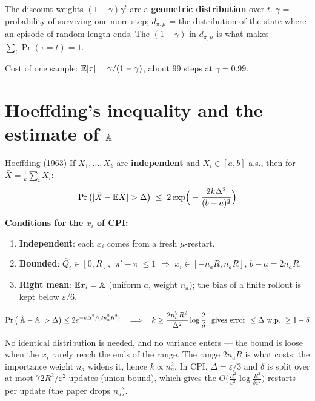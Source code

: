 \begin{keybox}
The discount weights $(1-\gamma)\gamma^t$ are a \textbf{geometric distribution} over $t$. $\gamma$ = probability of surviving one more step; $d_{\pi,\mu}$ = the distribution of the state where an episode of random length ends. The $(1-\gamma)$ in $d_{\pi,\mu}$ is what makes $\sum_t\Pr(\tau=t)=1$.
\end{keybox}
{\small Cost of one sample: $\mathbb{E}[\tau]=\gamma/(1-\gamma)$, about 99 steps at $\gamma=0.99$.}

\section{Hoeffding's inequality and the estimate of $\mathbb{A}$}
\label{app:hoeffding}

\begin{thmbox}{Hoeffding (1963)}
If $X_1,\dots,X_k$ are \textbf{independent} and $X_i\in[a,b]$ a.s., then for $\bar X=\frac1k\sum_iX_i$:
\begin{gather*}
  \Pr\big(|\bar X-\E\bar X|>\Delta\big) \;\le\; 2\exp\!\Big(-\frac{2k\Delta^2}{(b-a)^2}\Big)
\end{gather*}
\end{thmbox}

\textbf{Conditions for the $x_i$ of CPI:}
\begin{enumerate}
  \item \textbf{Independent}: each $x_i$ comes from a fresh $\mu$-restart.
  \item \textbf{Bounded}: $\hat Q_i\in[0,R]$, $|\pi'-\pi|\le1$ $\Rightarrow$ $x_i\in[-n_aR,n_aR]$, $b-a=2n_aR$.
  \item \textbf{Right mean}: $\mathbb{E} x_i=\mathbb{A}$ (uniform $a$, weight $n_a$); the bias of a finite rollout is kept below $\varepsilon/6$.
\end{enumerate}

\begin{eqbox}
\begin{gather*}
  \Pr\big(|\hat\PA-\PA|>\Delta\big) \le 2e^{-k\Delta^2/(2n_a^2R^2)}
  \quad\Longrightarrow\quad
  k \ge \frac{2n_a^2R^2}{\Delta^2}\log\frac2\delta \ \text{ gives error } \le\Delta \text{ w.p.\ } \ge1-\delta
\end{gather*}
\end{eqbox}

\begin{notebox}
No identical distribution is needed, and no variance enters --- the bound is loose when the $x_i$ rarely reach the ends of the range. The range $2n_aR$ is what costs: the importance weight $n_a$ widens it, hence $k\propto n_a^2$. In CPI, $\Delta=\varepsilon/3$ and $\delta$ is split over at most $72R^2/\varepsilon^2$ updates (union bound), which gives the $O\big(\frac{R^2}{\varepsilon^2}\log\frac{R^2}{\delta\varepsilon^2}\big)$ restarts per update (the paper drops $n_a$).
\end{notebox}

